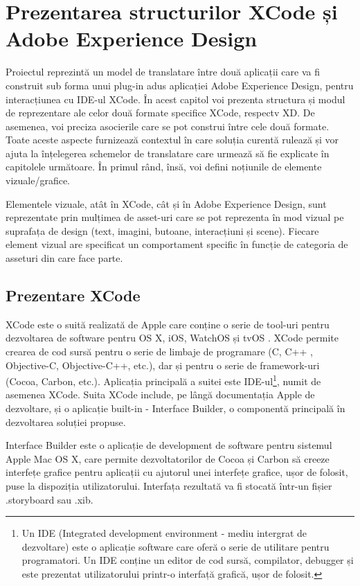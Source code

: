 \chapter{Prezentarea structurilor XCode și Adobe Experience Design}


Proiectul reprezintă un model de translatare între două aplicații care va fi construit sub forma unui plug-in adus aplicației Adobe Experience Design, pentru interacțiunea cu IDE-ul XCode. 
În acest capitol voi prezenta structura și modul de reprezentare ale celor două formate specifice XCode, respectv XD. De asemenea, voi preciza asocierile care se pot construi între cele două formate. Toate aceste aspecte furnizează contextul în care soluția curentă rulează și vor ajuta la înțelegerea schemelor de translatare care urmează să fie explicate în capitolele următoare. În primul rând, însă, voi defini noțiunile de elemente vizuale/grafice.

Elementele vizuale, atât în XCode, cât și în Adobe Experience Design, sunt reprezentate prin mulțimea de asset-uri care se pot reprezenta în mod vizual pe suprafața de design (text, imagini, butoane, interacțiuni și scene). Fiecare element vizual are specificat un comportament specific în funcție de categoria de asseturi din care face parte.


\section{Prezentare XCode}

XCode este o suită realizată de Apple care conține o serie de tool-uri pentru dezvoltarea de software pentru OS X, iOS, WatchOS și tvOS \cite{Aboutxcode}. XCode permite crearea de cod sursă pentru o serie de limbaje de programare (C, C++ , Objective-C, Objective-C++, etc.), dar și pentru o serie de framework-uri (Cocoa, Carbon, etc.). Aplicația principală a suitei este IDE-ul\footnote{Un IDE (Integrated development environment - mediu intergrat de dezvoltare) este o aplicație software care oferă o serie de utilitare pentru programatori. Un IDE conține un editor de cod sursă, compilator, debugger și este prezentat utilizatorului printr-o interfață grafică, ușor de folosit.}, numit de asemenea XCode. Suita XCode include, pe lângă documentația Apple de dezvoltare, și o aplicație built-in - Interface Builder, o componentă principală în dezvoltarea soluției propuse.

Interface Builder este o aplicație de development de software pentru sistemul Apple Mac OS X, care permite dezvoltatorilor de Cocoa și Carbon să creeze interfețe grafice pentru aplicații cu ajutorul unei interfețe grafice, ușor de folosit, puse la dispoziția utilizatorului. Interfața rezultată va fi stocată într-un fișier .storyboard sau .xib.

